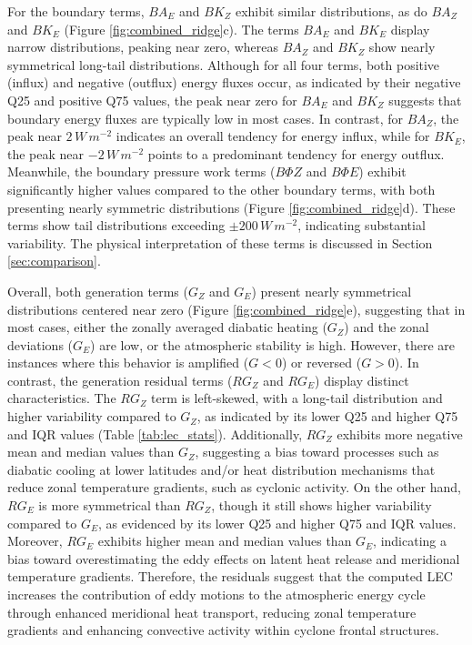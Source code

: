 \documentclass[pdflatex,sn-chicago]{sn-jnl}%
\theoremstyle{plain}
\theoremstyle{definition}
\theoremstyle{remark}
\theoremstyle{definition}
\begin{document}
For the boundary terms, $BA_E$ and $BK_Z$ exhibit similar distributions, as do $BA_Z$ and $BK_E$ (Figure \ref{fig:combined_ridge}c). The terms $BA_E$ and $BK_E$ display narrow distributions, peaking near zero, whereas $BA_Z$ and $BK_Z$ show nearly symmetrical long-tail distributions. Although for all four terms, both positive (influx) and negative (outflux) energy fluxes occur, as indicated by their negative Q25 and positive Q75 values, the peak near zero for $BA_E$ and $BK_Z$ suggests that boundary energy fluxes are typically low in most cases. In contrast, for $BA_Z$, the peak near $2 \, W \, m^{-2}$ indicates an overall tendency for energy influx, while for $BK_E$, the peak near $-2 \, W \, m^{-2}$ points to a predominant tendency for energy outflux. Meanwhile, the boundary pressure work terms ($B\Phi Z$ and $B\Phi E$) exhibit significantly higher values compared to the other boundary terms, with both presenting nearly symmetric distributions (Figure \ref{fig:combined_ridge}d). These terms show tail distributions exceeding $\pm 200 \, W \, m^{-2}$, indicating substantial variability. The physical interpretation of these terms is discussed in Section \ref{sec:comparison}.

Overall, both generation terms ($G_Z$ and $G_E$) present nearly symmetrical distributions centered near zero (Figure \ref{fig:combined_ridge}e), suggesting that in most cases, either the zonally averaged diabatic heating ($G_Z$) and the zonal deviations ($G_E$) are low, or the atmospheric stability is high. However, there are instances where this behavior is amplified ($G < 0$) or reversed ($G > 0$). In contrast, the generation residual terms ($RG_Z$ and $RG_E$) display distinct characteristics. The $RG_Z$ term is left-skewed, with a long-tail distribution and higher variability compared to $G_Z$, as indicated by its lower Q25 and higher Q75 and IQR values (Table \ref{tab:lec_stats}). Additionally, $RG_Z$ exhibits more negative mean and median values than $G_Z$, suggesting a bias toward processes such as diabatic cooling at lower latitudes and/or heat distribution mechanisms that reduce zonal temperature gradients, such as cyclonic activity. On the other hand, $RG_E$ is more symmetrical than $RG_Z$, though it still shows higher variability compared to $G_E$, as evidenced by its lower Q25 and higher Q75 and IQR values. Moreover, $RG_E$ exhibits higher mean and median values than $G_E$, indicating a bias toward overestimating the eddy effects on latent heat release and meridional temperature gradients. Therefore, the residuals suggest that the computed LEC increases the contribution of eddy motions to the atmospheric energy cycle through enhanced meridional heat transport, reducing zonal temperature gradients and enhancing convective activity within cyclone frontal structures.
\end{document}
